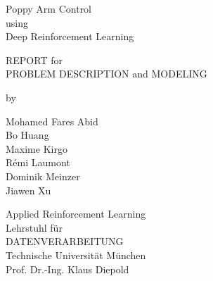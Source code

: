 \documentclass[a4paper,twoside, openright,12pt]{report}
\begin{document}
\pagestyle{empty}
\enlargethispage{4.5cm} %
\begin{center}
\phantom{u}
\vspace{0.5cm}
\Huge{\sc Poppy Arm Control \\ using \\ Deep Reinforcement Learning}\\
\vspace{1.5cm}

\large{REPORT for \\
PROBLEM DESCRIPTION and MODELING \\

\vspace{1.5cm}

by\\          

\vspace{0.4cm}

Mohamed Fares Abid \\						
Bo Huang \\
Maxime Kirgo \\					
R\'emi Laumont \\
Dominik Meinzer\\
Jiawen Xu \\
					
\vspace{0.5cm}

\vspace{1.5cm}
Applied Reinforcement Learning \\
Lehrstuhl f\"ur\\
DATENVERARBEITUNG\\
Technische Universit\"at M\"unchen\\
\vspace{0.3cm}
Prof. Dr.-Ing. Klaus Diepold}
\end{center}

\newpage

\pagestyle{fancy}

\tableofcontents 

\end{document}
